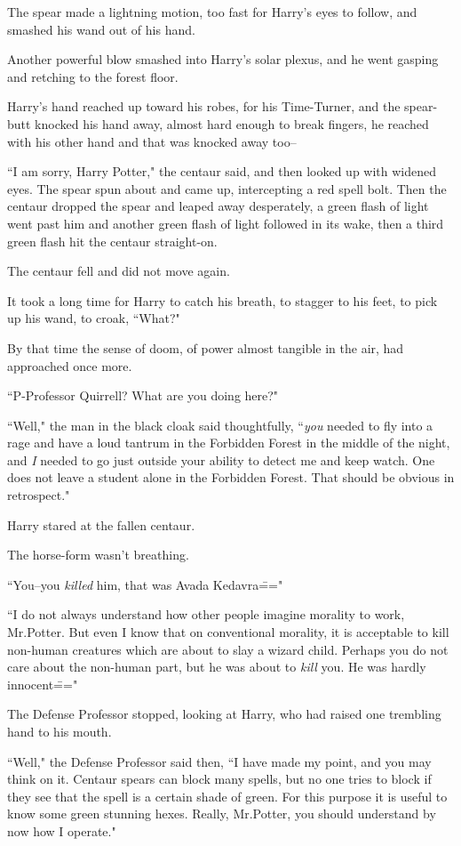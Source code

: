 The spear made a lightning motion, too fast for Harry's eyes to follow, and smashed his wand out of his hand.

Another powerful blow smashed into Harry's solar plexus, and he went gasping and retching to the forest floor.

Harry's hand reached up toward his robes, for his Time-Turner, and the spear-butt knocked his hand away, almost hard enough to break fingers, he reached with his other hand and that was knocked away too\---

``I am sorry, Harry Potter," the centaur said, and then looked up with widened eyes. The spear spun about and came up, intercepting a red spell bolt. Then the centaur dropped the spear and leaped away desperately, a green flash of light went past him and another green flash of light followed in its wake, then a third green flash hit the centaur straight-on.

The centaur fell and did not move again.

It took a long time for Harry to catch his breath, to stagger to his feet, to pick up his wand, to croak, ``What?"

By that time the sense of doom, of power almost tangible in the air, had approached once more.

``P-Professor Quirrell? What are you doing here?"

``Well," the man in the black cloak said thoughtfully, ``\emph{you} needed to fly into a rage and have a loud tantrum in the Forbidden Forest in the middle of the night, and \emph{I} needed to go just outside your ability to detect me and keep watch. One does not leave a student alone in the Forbidden Forest. That should be obvious in retrospect."

Harry stared at the fallen centaur.

The horse-form wasn't breathing.

``You\---you \emph{killed} him, that was Avada Kedavra\==="

``I do not always understand how other people imagine morality to work, Mr.\?Potter. But even I know that on conventional morality, it is acceptable to kill non-human creatures which are about to slay a wizard child. Perhaps you do not care about the non-human part, but he was about to \emph{kill} you. He was hardly innocent\==="

The Defense Professor stopped, looking at Harry, who had raised one trembling hand to his mouth.

``Well," the Defense Professor said then, ``I have made my point, and you may think on it. Centaur spears can block many spells, but no one tries to block if they see that the spell is a certain shade of green. For this purpose it is useful to know some green stunning hexes. Really, Mr.\?Potter, you should understand by now how I operate."

